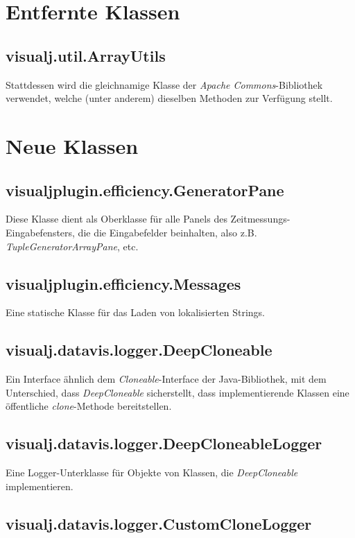 \documentclass[a4paper]{report}
\begin{document}
\section{Entfernte Klassen}

\subsection{visualj.util.ArrayUtils}

Stattdessen wird die gleichnamige Klasse der \emph{Apache Commons}-Bibliothek verwendet, welche (unter anderem) dieselben Methoden zur Verfügung stellt.

\section{Neue Klassen}

\subsection{visualjplugin.efficiency.GeneratorPane}

Diese Klasse dient als Oberklasse für alle Panels des Zeitmessungs-Eingabefensters, die die Eingabefelder beinhalten, also z.B. \emph{TupleGeneratorArrayPane}, etc.

\subsection{visualjplugin.efficiency.Messages}

Eine statische Klasse für das Laden von lokalisierten Strings.

\subsection{visualj.datavis.logger.DeepCloneable}

Ein Interface ähnlich dem \emph{Cloneable}-Interface der Java-Bibliothek, mit dem Unterschied, dass \emph{DeepCloneable} sicherstellt, dass implementierende Klassen eine öffentliche \emph{clone}-Methode bereitstellen.

\subsection{visualj.datavis.logger.DeepCloneableLogger}

Eine Logger-Unterklasse für Objekte von Klassen, die \emph{DeepCloneable} implementieren.

\subsection{visualj.datavis.logger.CustomCloneLogger}
\end{document}
